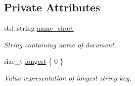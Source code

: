 \subsection*{Private Attributes}
\begin{DoxyCompactItemize}
\item 
\mbox{\label{class_document_ab15ddbb4889c3ed9be0eac73f9f1db94}} 
std\+::string \hyperlink{class_document_ab15ddbb4889c3ed9be0eac73f9f1db94}{name\+\_\+short}
\begin{DoxyCompactList}\small\item\em String containing name of document. \end{DoxyCompactList}\item 
\mbox{\label{class_document_ac0be9d01e5e7c2478f3857b0665789c7}} 
size\+\_\+t \hyperlink{class_document_ac0be9d01e5e7c2478f3857b0665789c7}{longest} \{ 0 \}
\begin{DoxyCompactList}\small\item\em Value representation of longest string key. \end{DoxyCompactList}\end{DoxyCompactItemize}
